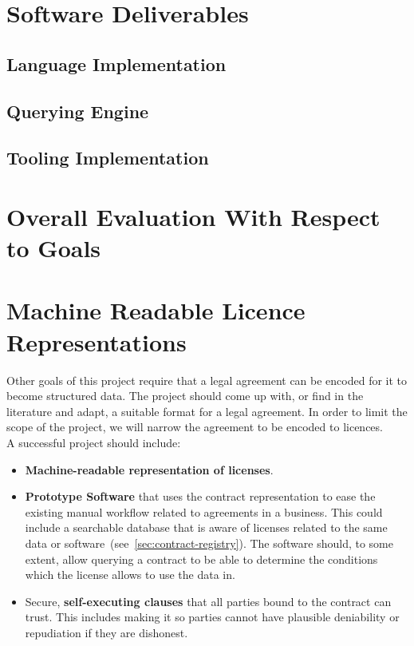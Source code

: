 \section{Software Deliverables}\label{sec:software-deliverables}

\subsection{Language Implementation}

\subsection{Querying Engine}

\subsection{Tooling Implementation}

\section[Overall Evaluation]{Overall Evaluation With Respect to Goals}


\section{Machine Readable Licence Representations}\label{sec:licence-representations}



Other goals of this project require that a legal agreement can be encoded for it to become
structured data.
The project should come up with, or find in the literature and adapt, a suitable format for a legal
agreement.
In order to limit the scope of the project, we will narrow the agreement to be encoded to
licences.\\

A successful project should include:
\begin{itemize}
    \item \textbf{Machine-readable representation of licenses}.
    \item \textbf{Prototype Software} that uses the contract representation to ease the existing
    manual workflow related to agreements in a business.
    This could include a searchable database that is aware of licenses related to the same data or
    software~(see~\ref{sec:contract-registry}).
    The software should, to some extent, allow querying a contract to be able to determine the
    conditions which the license allows to use the data in.
    \item Secure, \textbf{self-executing clauses} that all parties bound to the contract can trust.
    This includes making it so parties cannot have plausible deniability or repudiation if they are
    dishonest.
\end{itemize}

